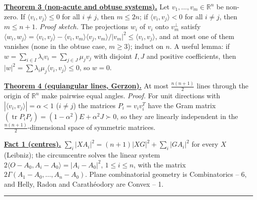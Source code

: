 \documentclass[11pt,a4paper]{article}
\newcommand{\head}[1]{\par\medskip\noindent\textbf{\underline{#1}}\quad}
\begin{document}
\head{Theorem 3 (non-acute and obtuse systems).} Let
$v_1,\dots,v_m\in\mathbb{R}^n$ be non-zero. If $\langle v_i,v_j\rangle\le0$ for all
$i\ne j$, then $m\le 2n$; if $\langle v_i,v_j\rangle<0$ for all $i\ne j$, then $m\le n+1$.
\emph{Proof sketch.} The projections $w_i$ of $v_i$ onto $v_m^\perp$ satisfy
$\langle w_i,w_j\rangle=\langle v_i,v_j\rangle-\langle v_i,v_m\rangle\langle
v_j,v_m\rangle/|v_m|^2\le\langle v_i,v_j\rangle$, and at most one of them vanishes
(none in the obtuse case, $m\ge3$); induct on $n$. A useful lemma: if
$w=\sum_{i\in I}\lambda_iv_i=\sum_{j\in J}\mu_jv_j$ with disjoint $I,J$ and positive
coefficients, then $|w|^2=\sum\lambda_i\mu_j\langle v_i,v_j\rangle\le0$, so $w=0$.

\head{Theorem 4 (equiangular lines, Gerzon).} At most $\frac{n(n+1)}2$ lines through
the origin of $\mathbb{R}^n$ make pairwise equal angles. \emph{Proof.} For unit
directions with $|\langle v_i,v_j\rangle|=\alpha<1$ ($i\ne j$) the matrices
$P_i=v_iv_i^T$ have the Gram matrix
$(\operatorname{tr}P_iP_j)=(1-\alpha^2)E+\alpha^2J\succ0$, so they are linearly
independent in the $\frac{n(n+1)}2$-dimensional space of symmetric matrices.

\head{Fact 1 (centres).} $\sum_i|XA_i|^2=(n+1)|XG|^2+\sum_i|GA_i|^2$ for every $X$
(Leibniz); the circumcentre solves the linear system
$2\langle O-A_0,A_i-A_0\rangle=|A_i-A_0|^2$, $1\le i\le n$, with the matrix
$2\Gamma(A_1-A_0,\dots,A_n-A_0)$. Plane combinatorial geometry is Combinatorics --
6, and Helly, Radon and Carath\'eodory are Convex -- 1.

\medskip\noindent\rule{\linewidth}{0.4pt}
\end{document}
